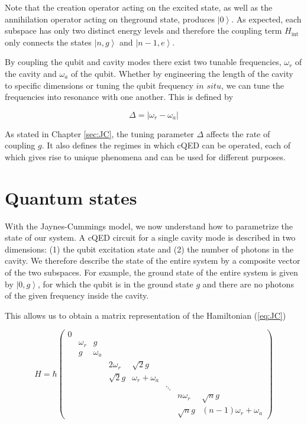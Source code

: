\documentclass[12 pt]{book}
\newcommand{\ket}[1]{\left| #1 \right>} %
\begin{document}
Note that the creation operator acting on the excited state, as well as the annihilation operator acting on theground state, produces $\ket{0}$. As expected, each subspace has only two distinct energy levels and therefore the coupling term $H_{\mathrm{int}}$ only connects the states $\ket{n,g}$ and $\ket{n-1,e}$.

By coupling the qubit and cavity modes there exist two tunable frequencies, $\omega_r$ of the cavity and $\omega_a$ of the qubit. Whether by engineering the length of the cavity to specific dimensions or tuning the qubit frequency $in$ $situ$, we can tune the frequencies into resonance with one another. This is defined by

\begin{equation}
\Delta = |\omega_r - \omega_a|
\end{equation}

As stated in Chapter \ref{sec:JC}, the tuning parameter $\Delta$ affects the rate of coupling $g$. It also defines the regimes in which cQED can be operated, each of which gives rise to unique phenomena and can be used for different purposes. 

\section{Quantum states}
With the Jaynes-Cummings model, we now understand how to parametrize the state of our system. A cQED circuit for a single cavity mode is described in two dimensions: (1) the qubit excitation state and (2) the number of photons in the cavity. We therefore describe the state of the entire system by a composite vector of the two subspaces. For example, the ground state of the entire system is given by $\ket{0,g}$, for which the qubit is in the ground state $g$ and there are no photons of the given frequency inside the cavity. 

This allows us to obtain a matrix representation of the Hamiltonian (\ref{eq:JC}) 

\begin{equation}\label{eq:Matrix}
H =  \hbar\left(\begin{array}{cccccccc}
0 \\
& \omega_r 	& g \\
& g    		& \omega_a \\
&&&2\omega_r	 & \sqrt{2}g \\
&&&\sqrt{2}g 		& \omega_r + \omega_a\\
&&&&&\ddots\\
&&&&&&n\omega_r & \sqrt{n}g\\
&&&&&&\sqrt{n}g    & (n-1)\omega_r+\omega_a
\end{array} \right)
\end{equation}
\end{document}
